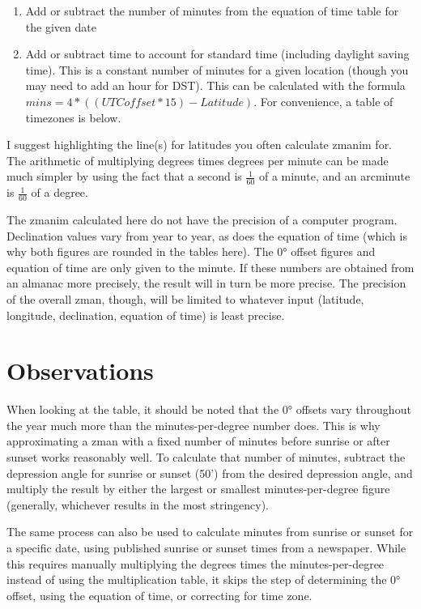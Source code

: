 \begin{enumerate}
	\item Add or subtract the number of minutes from the equation of time table for the given date
	\item Add or subtract time to account for standard time (including daylight saving time). This is a constant number of minutes for a given location (though you may need to add an hour for DST). This can be calculated with the formula $mins = 4 * \left(\left(UTCoffset * 15\right) - Latitude\right)$.  For convenience, a table of timezones is below.
\end{enumerate}

I suggest highlighting the line(s) for latitudes you often calculate zmanim for. The arithmetic of multiplying degrees times degrees per minute can be made much simpler by using the fact that a second is $\frac{1}{60}$ of a minute, and an arcminute is $\frac{1}{60}$ of a degree.

The zmanim calculated here do not have the precision of a computer program. Declination values vary from year to year, as does the equation of time (which is why both figures are rounded in the tables here). The 0° offset figures and equation of time are only given to the minute. If these numbers are obtained from an almanac more precisely, the result will in turn be more precise. The precision of the overall zman, though, will be limited to whatever input (latitude, longitude, declination, equation of time) is least precise.

\section{Observations}

When looking at the table, it should be noted that the 0° offsets vary throughout the year much more than the minutes-per-degree number does. This is why approximating a zman with a fixed number of minutes before sunrise or after sunset works reasonably well. To calculate that number of minutes, subtract the depression angle for sunrise or sunset (50') from the desired depression angle, and multiply the result by either the largest or smallest minutes-per-degree figure (generally, whichever results in the most stringency).

The same process can also be used to calculate minutes from sunrise or sunset for a specific date, using published sunrise or sunset times from a newspaper. While this requires manually multiplying the degrees times the minutes-per-degree instead of using the multiplication table, it skips the step of determining the 0° offset, using the equation of time, or correcting for time zone.\vfill

